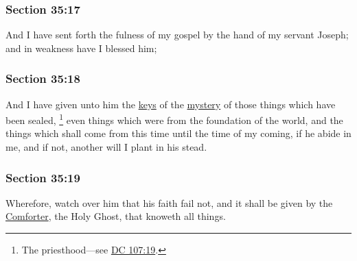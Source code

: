 	\subsubsection{Section 35:17} %
		\label{DC35-17}

		And I have sent forth the fulness of my gospel by the hand of my servant Joseph; and in weakness have I blessed him;


	\subsubsection{Section 35:18} %
		\label{DC35-18}

		And I have given unto him the \hyperref[KEY]{keys} of the \hyperref[MYSTERY]{mystery} of those things which have been sealed,%
			\footnote{%
				The priesthood---see \hyperref[DC107-19]{DC 107:19}.
				}
		even things which were from the foundation of the world, and the things which shall come from this time until the time of my coming, if he abide in me, and if not, another will I plant in his stead.


	\subsubsection{Section 35:19} %
		\label{DC35-19}

		Wherefore, watch over him that his faith fail not, and it shall be given by the \hyperref[COMFORTER]{Comforter}, the Holy Ghost, that knoweth all things.

